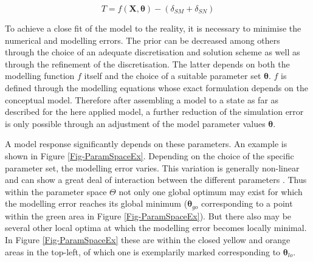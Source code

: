 \begin{equation}
    \label{Eq-CompSimTruth}
    T = f(\bm{X},\bm{\theta}) - (\delta_{SM} + \delta_{SN})
\end{equation}

To achieve a close fit of the model to the reality, it is necessary to minimise the numerical and modelling errors. 
The prior can be decreased among others through the choice of an adequate discretisation and solution scheme as well as through the refinement of the discretisation. 
The latter depends on both the modelling function $f$ itself and the choice of a suitable parameter set $\bm{\theta}$. 
$f$ is defined through the modelling equations whose exact formulation depends on the conceptual model. 
Therefore after assembling a model to a state as far as described for the here applied model, a further reduction of the simulation error is only possible through an adjustment of the model parameter values $\bm{\theta}$.

A model response significantly depends on these parameters. 
An example is shown in Figure \ref{Fig-ParamSpaceEx}. 
Depending on the choice of the specific parameter set, the modelling error varies. 
This variation is generally non-linear and can show a great deal of interaction between the different parameters \parencite{Duan.1993}. 
Thus within the parameter space $\Theta$ not only one global optimum may exist for which the modelling error reaches its global minimum ($\bm{\theta}_{go}$ corresponding to a point within the green area in Figure \ref{Fig-ParamSpaceEx}). 
But there also may be several other local optima at which the modelling error becomes locally minimal. 
In Figure \ref{Fig-ParamSpaceEx} these are within the closed yellow and orange areas in the top-left, of which one is exemplarily marked corresponding to $\bm{\theta}_{lo}$.

